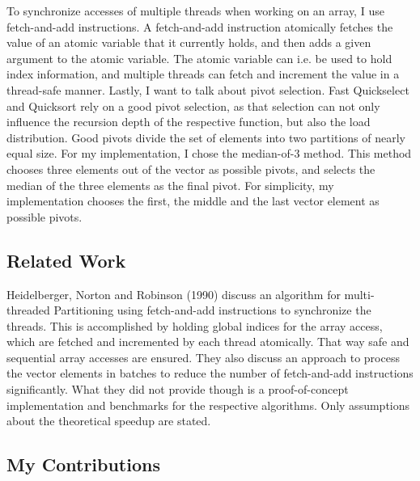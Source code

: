 \documentclass[sigconf]{acmart}
\begin{document}
To synchronize accesses of multiple threads when working on an array, I use fetch-and-add instructions. A fetch-and-add instruction atomically fetches the value of an atomic variable that it currently holds, and then adds a given argument to the atomic variable. The atomic variable can i.e. be used to hold index information, and multiple threads can fetch and increment the value in a thread-safe manner. Lastly, I want to talk about pivot selection. Fast Quickselect and Quicksort rely on a good pivot selection, as that selection can not only influence the recursion depth of the respective function, but also the load distribution. Good pivots divide the set of elements into two partitions of nearly equal size. For my implementation, I chose the median-of-3 method. This method chooses three elements out of the vector as possible pivots, and selects the median of the three elements as the final pivot. For simplicity, my implementation chooses the first, the middle and the last vector element as possible pivots.

\subsection{Related Work}

Heidelberger, Norton and Robinson (1990) discuss an algorithm for multi-threaded Partitioning using fetch-and-add instructions to synchronize the threads. This is accomplished by holding global indices for the array access, which are fetched and incremented by each thread atomically. That way safe and sequential array accesses are ensured. They also discuss an approach to process the vector elements in batches to reduce the number of fetch-and-add instructions significantly. What they did not provide though is a proof-of-concept implementation and benchmarks for the respective algorithms. Only assumptions about the theoretical speedup are stated. \cite{heidelberger1990}

\subsection{My Contributions}
\end{document}
